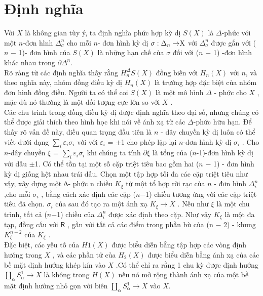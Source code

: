 \section{Định nghĩa}
\indent Với \(X\) là không gian tùy ý, ta định nghĩa phức hợp kỳ dị \(S(X)\) là \(\Delta\)-phức với một \(n\)-đơn hình \(\Delta_{\sigma}^n\) cho mỗi \(n\)- đơn hình kỳ dị \(\sigma : \Delta_n\rightarrow$X$\) với \(\Delta_{\sigma}^n\) được gắn với  (\(n\) − 1)- đơn hình  của \(S(X)\) là những hạn chế  của \(\sigma\) đối với (\(n\) − 1) -đơn hình  khác nhau trong \(\partial\Delta^n\). \\
\indent Rõ ràng từ các định nghĩa thấy  rằng \(H_n^{\Delta} S(X)\) đồng biến với \(H_n(X)\) với  \(n\), và theo nghĩa này, nhóm đồng điều kỳ dị  \(H_n(X)\) là trường hợp đặc biệt của nhóm đơn hình đồng điều. Người ta có thể coi \(S(X)\) là một mô hình \(\Delta\) - phức cho \(X\) , mặc dù nó thường là một đối tượng cực lớn so với \(X\) . \\
\indent Các chu trình trong đồng điều kỳ dị được định nghĩa theo đại số, nhưng chúng có thể được  giải thích theo hình học khi nói về ánh xạ từ các \(\Delta\)-phức hữu hạn. Để thấy rõ vấn đề này, điều quan trọng đầu tiên là \(n\) - dây chuyền kỳ dị  luôn có thể viết dưới dạng \(\sum_{i}\varepsilon_i\sigma_i\) với với \(\varepsilon_i\) = \(\pm\)1 cho phép lặp lại \(n\)-đơn hình kỳ dị \(\sigma_i\) . Cho \(n\)-dây chuyền \(\xi\) = \(\sum_{i}\varepsilon_i\sigma_i\) khi chúng ta tính \(\partial\xi\)  là tổng của (\(n\)-1)-đơn hình kỳ dị với dấu \(\pm\)1. Có thể tồn tại một số cặp triệt tiêu bao gồm hai  (\(n\) − 1) - đơn hình kỳ dị giống hệt nhau trái dấu. Chọn một tập hợp tối đa các cặp triệt tiêu như vậy, xây dựng một  ∆- phức  n chiều \(K_{\xi}\) từ một tổ hợp  rời rạc của \(n\) - đơn hình \(\Delta_i^n\) ,cho mỗi \(\sigma_i\) , bằng cách xác định các cặp (\(n\)−1) chiều tương ứng với các cặp triệt tiêu đã chọn. \(\sigma_i\)  của sau đó tạo ra một ánh xạ \(K_{\xi} \rightarrow X\) . Nếu như \(\xi\) là một chu trình, tất cả (\(n\)−1)  chiều của \(\Delta_i^n\)  được xác định theo cặp. Như vậy \(K_{\xi}\) là một đa tạp, đồng cấu với $\mathsf{R}$ , gần với tất cả các điểm trong phần bù của (n − 2) - khung \(K^{n-2}_{\xi}\) của \(K_\xi\) . \\
\indent Đặc biệt, các yếu tố của \(H1(X)\) được biểu diễn bằng tập hợp các vòng định hướng trong \(X\) , và các phần tử của \(H_2(X)\) được biểu diễn bằng ánh xạ của các bề mặt định hướng khép kín vào \(X\) .Có thể chỉ ra rằng 1 chu kỳ được định hướng \(\amalg_{\alpha}S^1_{\alpha} \rightarrow X\) là không trong \(H(X)\) nếu nó mở rộng thành ánh xạ của một bề mặt định hướng nhỏ gọn với biên \(\amalg_{\alpha}S^1_{\alpha} \rightarrow X\) vào \(X\).

